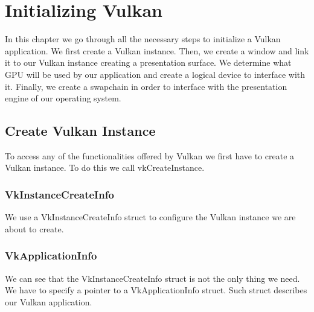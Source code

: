 \chapter{Initializing Vulkan}

In this chapter we go through all the necessary steps to initialize a
Vulkan application.
We first create a Vulkan instance.
Then, we create a window and link it to our Vulkan instance creating a presentation
surface.
We determine what GPU will be used by our application and create a logical device
to interface with it.
Finally, we create a swapchain in order to interface with the presentation engine
of our operating system.

\section{Create Vulkan Instance}

To access any of the functionalities offered by Vulkan we first have to create a Vulkan
instance.
To do this we call vkCreateInstance.

\begin{minipage}{\linewidth}{\noindent}
    
\end{minipage}

\subsection{VkInstanceCreateInfo}

We use a VkInstanceCreateInfo struct to configure the Vulkan instance we are about
to create.

\begin{minipage}{\linewidth}{\noindent}

\end{minipage}

\subsection{VkApplicationInfo}

We can see that the VkInstanceCreateInfo struct is not the only thing we need.
We have to specify a pointer to a VkApplicationInfo struct. Such struct describes
our Vulkan application.

